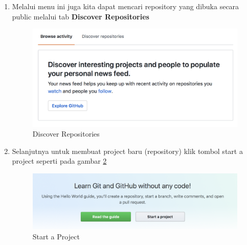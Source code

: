 \begin{enumerate}
\item Melalui menu ini juga kita dapat mencari repository yang dibuka secara public melalui tab \textbf{Discover Repositories}
\begin{figure}[!htbp]
\centerline{\includegraphics[width=.75\textwidth]{Figures/akunGit/7.PNG}}
\caption{Discover Repositories}
\label{7}
\end{figure} 
\item Selanjutnya untuk membuat project baru (repository) klik tombol start a project seperti pada gambar \ref{8}
\begin{figure}[!htbp]
\centerline{\includegraphics[width=.75\textwidth]{Figures/akunGit/8.PNG}}
\caption{Start a Project}
\label{8}
\end{figure} 
\end{enumerate}